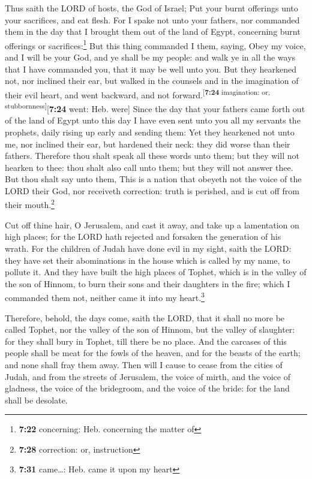  Thus saith the LORD of hosts, the God of Israel; Put
your burnt offerings unto your sacrifices, and eat flesh.
 For I spake not unto your fathers, nor commanded them in
the day that I brought them out of the land of Egypt, concerning burnt
offerings or sacrifices:\footnote{\textbf{7:22} concerning: Heb.
  concerning the matter of}  But this thing commanded I
them, saying, Obey my voice, and I will be your God, and ye shall be my
people: and walk ye in all the ways that I have commanded you, that it
may be well unto you.  But they hearkened not, nor
inclined their ear, but walked in the counsels and in the imagination of
their evil heart, and went backward, and not
forward.\textsuperscript{{[}\textbf{7:24} imagination: or,
stubbornness{]}}{[}\textbf{7:24} went: Heb. were{]} 
Since the day that your fathers came forth out of the land of Egypt unto
this day I have even sent unto you all my servants the prophets, daily
rising up early and sending them:  Yet they hearkened not
unto me, nor inclined their ear, but hardened their neck: they did worse
than their fathers.  Therefore thou shalt speak all these
words unto them; but they will not hearken to thee: thou shalt also call
unto them; but they will not answer thee.  But thou shalt
say unto them, This is a nation that obeyeth not the voice of the LORD
their God, nor receiveth correction: truth is perished, and is cut off
from their mouth.\footnote{\textbf{7:28} correction: or, instruction}

 Cut off thine hair, O Jerusalem, and cast it away, and
take up a lamentation on high places; for the LORD hath rejected and
forsaken the generation of his wrath.  For the children
of Judah have done evil in my sight, saith the LORD: they have set their
abominations in the house which is called by my name, to pollute it.
 And they have built the high places of Tophet, which is
in the valley of the son of Hinnom, to burn their sons and their
daughters in the fire; which I commanded them not, neither came it into
my heart.\footnote{\textbf{7:31} came\ldots: Heb. came it upon my heart}

 Therefore, behold, the days come, saith the LORD, that
it shall no more be called Tophet, nor the valley of the son of Hinnom,
but the valley of slaughter: for they shall bury in Tophet, till there
be no place.  And the carcases of this people shall be
meat for the fowls of the heaven, and for the beasts of the earth; and
none shall fray them away.  Then will I cause to cease
from the cities of Judah, and from the streets of Jerusalem, the voice
of mirth, and the voice of gladness, the voice of the bridegroom, and
the voice of the bride: for the land shall be desolate.

